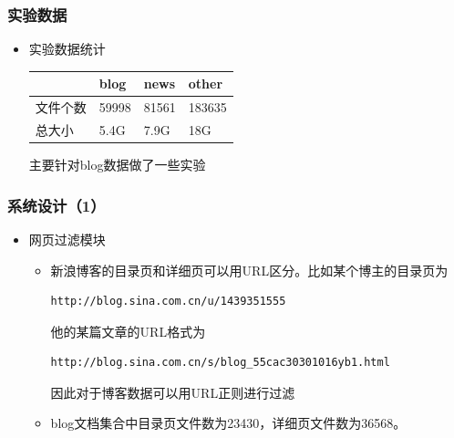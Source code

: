 \documentclass[11pt,presentation]{beamer}
\begin{document}
\begin{frame}
\frametitle{实验数据}
\label{sec-2-4}
\begin{itemize}

\item 实验数据统计\\
\label{sec-2-4-1}%
\begin{center}
\begin{tabular}{llll}
           &  blog   &  news   &  other   \\
\hline
 文件个数  &  59998  &  81561  &  183635  \\
 总大小    &  5.4G   &  7.9G   &  18G     \\
\end{tabular}
\end{center}



    主要针对blog数据做了一些实验
\end{itemize} %
\end{frame}
\begin{frame}[fragile]
\frametitle{系统设计（1）}
\label{sec-2-5}
\begin{itemize}

\item 网页过滤模块
\label{sec-2-5-1}%
\begin{itemize}
\item 新浪博客的目录页和详细页可以用URL区分。比如某个博主的目录页为
  \tiny

\begin{verbatim}
http://blog.sina.com.cn/u/1439351555
\end{verbatim}
  \normalsize
  他的某篇文章的URL格式为
  \tiny

\begin{verbatim}
http://blog.sina.com.cn/s/blog_55cac30301016yb1.html
\end{verbatim}
  \normalsize
  因此对于博客数据可以用URL正则进行过滤
\item blog文档集合中目录页文件数为23430，详细页文件数为36568。
\end{itemize}

\end{itemize} %
\end{frame}
\end{document}
